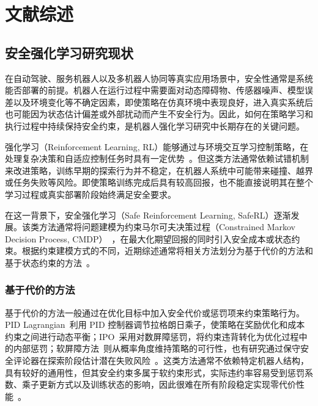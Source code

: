 \let\cleardoublepage\clearpage
\chapter{文献综述}
\section{安全强化学习研究现状}

在自动驾驶、服务机器人以及多机器人协同等真实应用场景中，安全性通常是系统能否部署的前提。机器人在运行过程中需要面对动态障碍物、传感器噪声、模型误差以及环境变化等不确定因素，即使策略在仿真环境中表现良好，进入真实系统后也可能因为状态估计偏差或外部扰动而产生不安全行为。因此，如何在策略学习和执行过程中持续保持安全约束，是机器人强化学习研究中长期存在的关键问题。

强化学习（Reinforcement Learning, RL）能够通过与环境交互学习控制策略，在处理复杂决策和自适应控制任务时具有一定优势~\cite{gu2024review,brunke2022safe_learning_robotics,ray2019benchmarking,ji2024omnisafe}。但这类方法通常依赖试错机制来改进策略，训练早期的探索行为并不稳定，在机器人系统中可能带来碰撞、越界或任务失败等风险。即使策略训练完成后具有较高回报，也不能直接说明其在整个学习过程或真实部署阶段始终满足安全要求。

在这一背景下，安全强化学习（Safe Reinforcement Learning, SafeRL）逐渐发展。该类方法通常将问题建模为约束马尔可夫决策过程（Constrained Markov Decision Process, CMDP）~\cite{altman1999cmdp}，在最大化期望回报的同时引入安全成本或状态约束。根据约束建模方式的不同，近期综述通常将相关方法划分为基于代价的方法和基于状态约束的方法~\cite{gu2024review,zhao2023statewise_safe_survey}。

\subsection{基于代价的方法}

基于代价的方法一般通过在优化目标中加入安全代价或惩罚项来约束策略行为。PID Lagrangian~\cite{stooke2020responsive}利用 PID 控制器调节拉格朗日乘子，使策略在奖励优化和成本约束之间进行动态平衡；IPO~\cite{liu2020ipo}采用对数屏障惩罚，将约束违背转化为优化过程中的内部惩罚；软屏障方法~\cite{wang2023enforcing}则从概率角度维持策略的可行性，也有研究通过保守安全评论器在探索阶段估计潜在失败风险~\cite{bharadhwaj2021conservative_safety_critics}。这类方法通常不依赖特定机器人结构，具有较好的通用性，但其安全约束多属于软约束形式，实际违约率容易受到惩罚系数、乘子更新方式以及训练状态的影响，因此很难在所有阶段稳定实现零代价性能~\cite{zhao2023statewise_safe_survey}。

